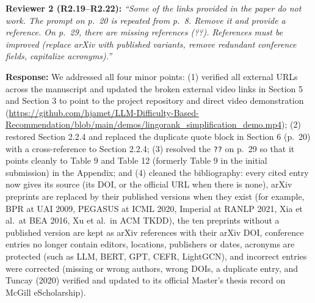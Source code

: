 \documentclass[11pt,a4paper]{article}
\newcommand{\mm}[1]{#1}
\newcommand{\mmhl}[1]{#1}
\begin{document}
\begin{reviewbox}
\textbf{Reviewer 2 (R2.19--R2.22):} \textit{``Some of the links provided in the paper do not work. The prompt on p.\ 20 is repeated from p.\ 8. Remove it and provide a reference. On p.\ 29, there are missing references (??). References must be improved (replace arXiv with published variants, remove redundant conference fields, capitalize acronyms).''}
\end{reviewbox}

\noindent\textbf{Response:}
\sloppy We addressed all four minor points: (1) verified all external URLs across the manuscript and updated the broken external video links in Section 5 and Section 3 to point to the project repository and direct video demonstration (\url{https://github.com/hjamet/LLM-Difficulty-Based-Recommendation/blob/main/demos/lingorank_simplification_demo.mp4}); (2) restored Section 2.2.4 and replaced the duplicate quote block in Section 6 (p.\ 20) with a cross-reference to Section 2.2.4; (3) resolved the \texttt{??} on p.\ 29 so that it points cleanly to Table \mmhl{9} and Table \mmhl{12} (formerly Table 9 in the initial submission) in the Appendix; and (4) \mm{cleaned the bibliography: every cited entry now gives its source (its DOI, or the official URL when there is none), arXiv preprints are replaced by their published versions when they exist (for example, BPR at UAI 2009, PEGASUS at ICML 2020, Imperial at RANLP 2021, Xia et al.\ at BEA 2016, Xu et al.\ in ACM TKDD), the ten preprints without a published version are kept as arXiv references with their arXiv DOI, conference entries no longer contain editors, locations, publishers or dates, acronyms are protected (such as LLM, BERT, GPT, CEFR, LightGCN), and incorrect entries were corrected (missing or wrong authors, wrong DOIs, a duplicate entry, and Tuncay (2020) verified and updated to its official Master's thesis record on McGill eScholarship).}%
\end{document}
